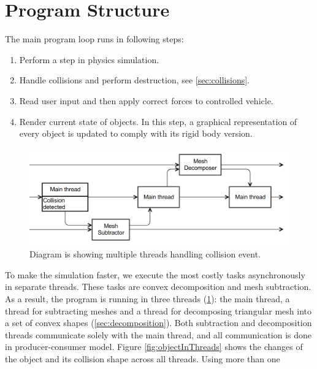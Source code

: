 \section{Program Structure}
The main program loop runs in following steps:
\begin{enumerate}
\item Perform a step in physics simulation.
\item Handle collisions and perform destruction, see \cref{sec:collisions}.
\item Read user input and then apply correct forces to controlled vehicle.
\item Render current state of objects. In this step, a graphical representation of every object is updated to comply with its rigid body version.
\end{enumerate}

\begin{figure}
        \centering
        \includegraphics[width=\textwidth]{img/decompositionFlow}
        \caption{Diagram is showing multiple threads handling collision event. }
        \label{fig:threads}
\end{figure}
To make the simulation faster, we execute the most costly tasks asynchronously in separate threads. These tasks are convex decomposition and mesh subtraction. As a result, the program is running in three threads (\cref{fig:threads}): the main thread, a thread for subtracting meshes and a thread for decomposing triangular mesh into a set of convex shapes (\cref{sec:decomposition}). Both subtraction and decomposition threads communicate solely with the main thread, and all communication is done in producer-consumer model. Figure \ref{fig:objectInThreads} shows the changes of the object and its collision shape across all threads. Using more than one 


